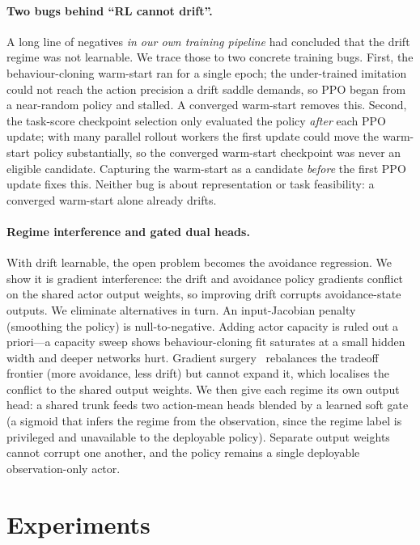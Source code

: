 \documentclass[11pt]{article}
\begin{document}
\paragraph{Two bugs behind ``RL cannot drift''.}
A long line of negatives \emph{in our own training pipeline} had concluded that the drift regime was not learnable.
We trace those to two concrete training bugs. First, the behaviour-cloning warm-start ran for a
single epoch; the under-trained imitation could not reach the action precision a drift saddle
demands, so PPO began from a near-random policy and stalled. A converged warm-start removes this.
Second, the task-score checkpoint selection only evaluated the policy \emph{after} each PPO update;
with many parallel rollout workers the first update could move the warm-start policy substantially,
so the converged warm-start checkpoint was never an eligible candidate. Capturing the warm-start as
a candidate \emph{before} the first PPO update fixes this. Neither bug is about representation or
task feasibility: a converged warm-start alone already drifts.

\paragraph{Regime interference and gated dual heads.}
With drift learnable, the open problem becomes the avoidance regression. We show it is gradient
interference: the drift and avoidance policy gradients conflict on the shared actor output weights,
so improving drift corrupts avoidance-state outputs. We eliminate alternatives in turn. An
input-Jacobian penalty (smoothing the policy) is null-to-negative. Adding actor capacity is ruled
out a priori---a capacity sweep shows behaviour-cloning fit saturates at a small hidden width and
deeper networks hurt. Gradient surgery~\citep{yu2020gradient} rebalances the tradeoff frontier
(more avoidance, less drift) but cannot expand it, which localises the conflict to the shared output
weights. We then give each regime its own output head: a shared trunk feeds two action-mean heads
blended by a learned soft gate (a sigmoid that infers the regime from the observation, since the
regime label is privileged and unavailable to the deployable policy). Separate output weights cannot
corrupt one another, and the policy remains a single deployable observation-only actor.

\section{Experiments}
\end{document}

